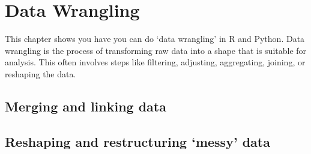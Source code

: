 \chapter{Data Wrangling}
\label{chap:datawrangling}
This chapter shows you have you can do `data wrangling' in R and Python.
Data wrangling is the process of transforming raw data into a shape that is suitable for analysis.
This often involves steps like filtering, adjusting, aggregating, joining, or reshaping the data.






\section{Merging and linking  data}
\section{Reshaping and restructuring ‘messy’ data}

